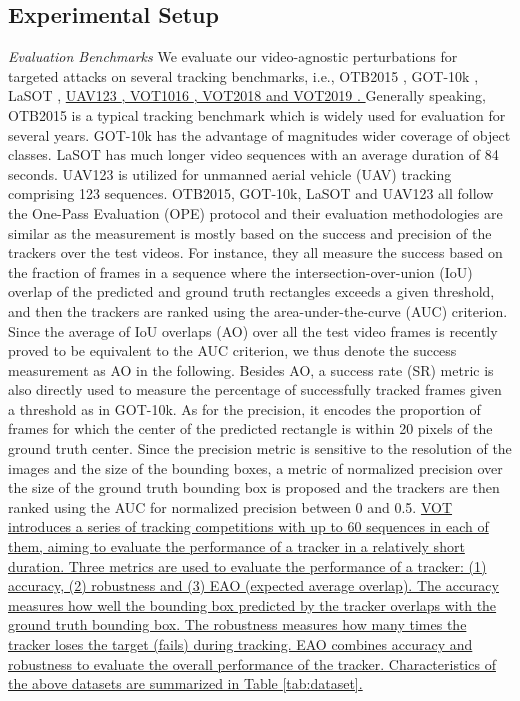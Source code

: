\documentclass[journal]{IEEEtran}
\newcommand{\ie}{i.e.}
\begin{document}
\subsection{Experimental Setup}

\textit{Evaluation Benchmarks} We evaluate our video-agnostic perturbations for targeted attacks on several tracking benchmarks, \ie, OTB2015 \cite{OTB}, GOT-10k \cite{GOT-10k}, LaSOT \cite{LaSOT}, 
\uline{
UAV123 \cite{UAV123}, VOT1016 \cite{VOT2016}, VOT2018 \cite{VOT2018} and VOT2019 \cite{VOT2019}. 
}
Generally speaking, OTB2015 is a typical tracking benchmark which is widely used for evaluation for several years. 
GOT-10k has the advantage of magnitudes wider coverage of object classes. 
LaSOT has much longer video sequences with an average duration of 84 seconds.
UAV123 is utilized for unmanned aerial vehicle (UAV) tracking comprising 123 sequences. 
OTB2015, GOT-10k, LaSOT and UAV123 all follow the One-Pass Evaluation (OPE) protocol and their evaluation methodologies are similar as the measurement is mostly based on the success and precision of the trackers over the test videos. For instance, they all measure the success based on the fraction of frames in a sequence where the intersection-over-union (IoU) overlap of the predicted and ground truth rectangles exceeds a given threshold, and then the trackers are ranked using the area-under-the-curve (AUC) criterion. Since the average of IoU overlaps (AO) over all the test video frames is recently proved to be equivalent to the AUC criterion, we thus denote the success measurement as AO in the following. Besides AO, a success rate (SR) metric is also directly used to measure the percentage of successfully tracked frames given a threshold as in GOT-10k. As for the precision, it encodes the proportion of frames for which the center of the predicted rectangle is within 20 pixels of the ground truth center. Since the precision metric is sensitive to the resolution of the images and the size of the bounding boxes, a metric of normalized precision over the size of the ground truth bounding box is proposed and the trackers are then ranked using the AUC for normalized precision between 0 and 0.5. 
\uline{
VOT \cite{VOT2016,VOT2018,VOT2019} introduces a series of tracking competitions with up to 60 sequences in each of them, aiming to evaluate the performance of a tracker in a relatively short duration. 
Three metrics are used to evaluate the performance of a tracker: (1) accuracy, (2) robustness and (3) EAO (expected average overlap). The accuracy measures how well the bounding box predicted by the tracker overlaps with the ground truth bounding box. The robustness measures how many times the tracker loses the target (fails) during tracking. EAO combines accuracy and robustness to evaluate the overall performance of the tracker.
Characteristics of the above datasets are summarized in Table \ref{tab:dataset}.
}
\end{document}
